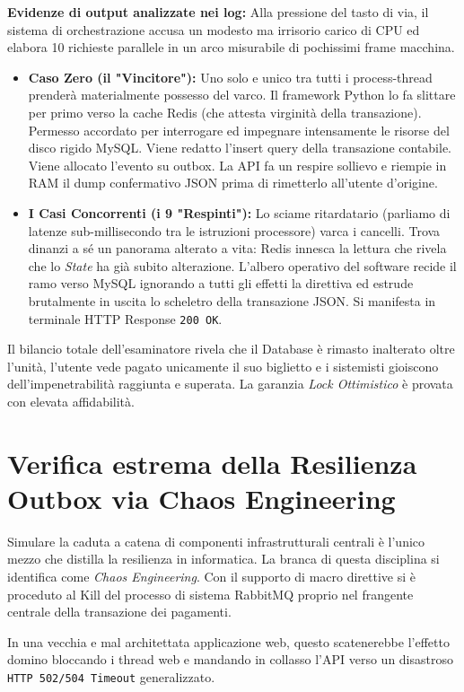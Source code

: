 \documentclass[11pt,a4paper]{report}
\begin{document}
\textbf{Evidenze di output analizzate nei log:} 
Alla pressione del tasto di via, il sistema di orchestrazione accusa un modesto ma irrisorio carico di CPU ed elabora 10 richieste parallele in un arco misurabile di pochissimi frame macchina.
\begin{itemize}
    \item \textbf{Caso Zero (il "Vincitore"):} Uno solo e unico tra tutti i process-thread prender\`a materialmente possesso del varco. Il framework Python lo fa slittare per primo verso la cache Redis (che attesta virginit\`a della transazione). Permesso accordato per interrogare ed impegnare intensamente le risorse del disco rigido MySQL. Viene redatto l'insert query della transazione contabile. Viene allocato l'evento su outbox. La API fa un respire sollievo e riempie in RAM il dump confermativo JSON prima di rimetterlo all'utente d'origine.
    \item \textbf{I Casi Concorrenti (i 9 "Respinti"):} Lo sciame ritardatario (parliamo di latenze sub-millisecondo tra le istruzioni processore) varca i cancelli. Trova dinanzi a s\'e un panorama alterato a vita: Redis innesca la lettura che rivela che lo \textit{State} ha gi\`a subito alterazione. L'albero operativo del software recide il ramo verso MySQL ignorando a tutti gli effetti la direttiva ed estrude brutalmente in uscita lo scheletro della transazione JSON. Si manifesta in terminale HTTP Response \texttt{200 OK}. 
\end{itemize}

Il bilancio totale dell'esaminatore rivela che il Database \`e rimasto inalterato oltre l'unit\`a, l'utente vede pagato unicamente il suo biglietto e i sistemisti gioiscono dell'impenetrabilit\`a raggiunta e superata. La garanzia \textit{Lock Ottimistico} \`e provata con elevata affidabilità.

\section{Verifica estrema della Resilienza Outbox via Chaos Engineering}
Simulare la caduta a catena di componenti infrastrutturali centrali \`e l'unico mezzo che distilla la resilienza in informatica. La branca di questa disciplina si identifica come \textit{Chaos Engineering}.
Con il supporto di macro direttive si \`e proceduto al Kill del processo di sistema RabbitMQ proprio nel frangente centrale della transazione dei pagamenti.

In una vecchia e mal architettata applicazione web, questo scatenerebbe l'effetto domino bloccando i thread web e mandando in collasso l'API verso un disastroso \texttt{HTTP 502/504 Timeout} generalizzato.
\end{document}
